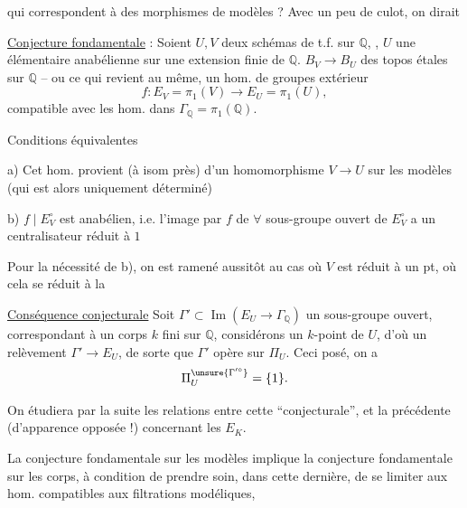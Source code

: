 qui correspondent à des morphismes de modèles ? Avec un peu de culot, on dirait

\uline{Conjecture fondamentale} : Soient $U,V$ deux schémas de t.f. sur $\mathbb{Q}$,  , $U$ une   élémentaire anabélienne sur une extension finie de $\mathbb{Q}$.     $B_V\longrightarrow B_U$ des topos étales sur $\mathbb{Q}$ -- ou ce qui revient au même, un hom. de groupes extérieur
\[
f:E_V=\pi_1(V)\longrightarrow E_U=\pi_1(U),
\]
compatible avec les hom. dans $\Gamma_{\mathbb{Q}}=\pi_1(\mathbb{Q})$.

Conditions équivalentes

 a) Cet hom. provient (à isom près) d'un homomorphisme $V\longrightarrow U$ sur les modèles (qui est alors uniquement déterminé)

 b) $f\mid E_V^\circ$ est anabélien, i.e. l'image par $f$ de $\forall$ sous-groupe ouvert de $E_V^\circ$ a un centralisateur réduit à $1$

Pour la nécessité de b), on est ramené aussitôt au cas où $V$ est réduit à un pt, où cela se réduit à la 

\uline{Conséquence conjecturale} Soit $\Gamma'\subset\operatorname{Im}(E_U\longrightarrow\Gamma_{\mathbb{Q}})$ un sous-groupe ouvert, correspondant à un corps $k$ fini sur $\mathbb{Q}$, considérons un $k$-point de $U$, d'où un relèvement $\Gamma'\longrightarrow E_U$, de sorte que $\Gamma'$ opère sur $\Pi_U$. Ceci posé, on a
\[
\Pi_U^{\unsure{\Gamma'^\circ}}=\{1\}.
\]

On étudiera par la suite les relations entre cette  ``conjecturale'', et la précédente (d'apparence opposée !) concernant les $E_K$.

La conjecture fondamentale sur les modèles implique la conjecture fondamentale sur les corps, à condition de prendre soin, dans cette dernière, de se limiter aux hom. compatibles aux filtrations modéliques,

